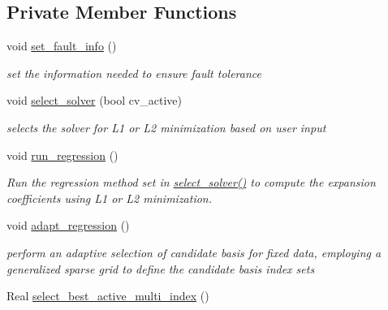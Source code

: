 \subsection*{Private Member Functions}
\begin{DoxyCompactItemize}
\item 
void \hyperlink{classPecos_1_1RegressOrthogPolyApproximation_a964315e08afd9d4511296ab8008e5e5a}{set\+\_\+fault\+\_\+info} ()\label{classPecos_1_1RegressOrthogPolyApproximation_a964315e08afd9d4511296ab8008e5e5a}

\begin{DoxyCompactList}\small\item\em set the information needed to ensure fault tolerance \end{DoxyCompactList}\item 
void \hyperlink{classPecos_1_1RegressOrthogPolyApproximation_ae78d3d33497fe9098edd746de21a7ec1}{select\+\_\+solver} (bool cv\+\_\+active)
\begin{DoxyCompactList}\small\item\em selects the solver for L1 or L2 minimization based on user input \end{DoxyCompactList}\item 
void \hyperlink{classPecos_1_1RegressOrthogPolyApproximation_a08178623bb5f60f7c648a50e0881ea67}{run\+\_\+regression} ()\label{classPecos_1_1RegressOrthogPolyApproximation_a08178623bb5f60f7c648a50e0881ea67}

\begin{DoxyCompactList}\small\item\em Run the regression method set in \hyperlink{classPecos_1_1RegressOrthogPolyApproximation_ae78d3d33497fe9098edd746de21a7ec1}{select\+\_\+solver()} to compute the expansion coefficients using L1 or L2 minimization. \end{DoxyCompactList}\item 
void \hyperlink{classPecos_1_1RegressOrthogPolyApproximation_ab929bba0036bc4faded3c5d04096c5e7}{adapt\+\_\+regression} ()\label{classPecos_1_1RegressOrthogPolyApproximation_ab929bba0036bc4faded3c5d04096c5e7}

\begin{DoxyCompactList}\small\item\em perform an adaptive selection of candidate basis for fixed data, employing a generalized sparse grid to define the candidate basis index sets \end{DoxyCompactList}\item 
Real \hyperlink{classPecos_1_1RegressOrthogPolyApproximation_a45d104d728774a70b5eb5db9c973fbb9}{select\+\_\+best\+\_\+active\+\_\+multi\+\_\+index} ()\label{classPecos_1_1RegressOrthogPolyApproximation_a45d104d728774a70b5eb5db9c973fbb9}


\end{DoxyCompactItemize}
